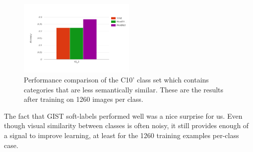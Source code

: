 \begin{figure}[!tb]
  \centering
  \includegraphics[width=0.5\textwidth]{figs/10_3-train_1260.png}
  \caption{
      Performance comparison of the C10' class set which contains categories
      that are less semantically similar. These are the results after training
      on 1260 images per class.
  }
  \label{fig:10_3-train_1260}
\end{figure}

The fact that GIST soft-labels performed well was a nice surprise for us. Even
though visual similarity between classes is often noisy, it still provides
enough of a signal to improve learning, at least for the 1260 training examples
per-class case.





